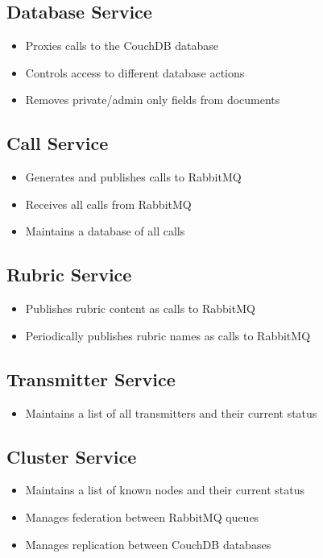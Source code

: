 \subsection{Database Service}
\begin{itemize}
\item Proxies calls to the CouchDB database
\item Controls access to different database actions
\item Removes private/admin only fields from documents
\end{itemize}

\subsection{Call Service}
\begin{itemize}
\item Generates and publishes calls to RabbitMQ
\item Receives all calls from RabbitMQ
\item Maintains a database of all calls
\end{itemize}

\subsection{Rubric Service}
\begin{itemize}
\item Publishes rubric content as calls to RabbitMQ
\item Periodically publishes rubric names as calls to RabbitMQ
\end{itemize}

\subsection{Transmitter Service}
\begin{itemize}
\item Maintains a list of all transmitters and their current status
\end{itemize}

\subsection{Cluster Service}
\begin{itemize}
\item Maintains a list of known nodes and their current status
\item Manages federation between RabbitMQ queues
\item Manages replication between CouchDB databases
\end{itemize}

